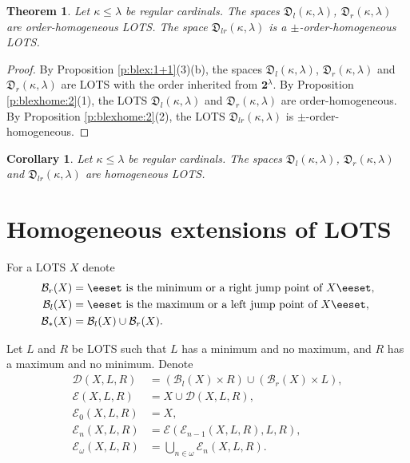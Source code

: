\documentclass[preprint]{elsarticle}
\def\om{\omega}
\def\la{\lambda}
\def\ka{\kappa}
\def\cB{\mathcal{B}}
\def\cE{\mathcal{E}}
\def\set#1{\bbset#1\eeset}
\def\bbset#1:#2\eeset{\{#1\,:\,#2\}}
\def\cB{{\mathcal B}}
\def\cB{{\mathcal B}}
\def\cD{{\mathcal D}}
\newtheorem{theorem}{Theorem}[section]
\newtheorem{cor}{Corollary}[section]
\theoremstyle{definition}
\theoremstyle{remark}
\def\lex#1#2{\mathfrak{L}(#2^{#1})}
\def\lex#1#2{#2^{#1}}
\def\homg#1,#2#3{\mathfrak{D}_{#1}(#2,#3)}
\def\B{2}
\def\B{\mathsf{2}}
\def\B{\mathbf{2}}
\def\lexab{\lex\la\B}
\def\nr{N_r}
\def\nl{N_l}
\def\er{\cB_r}
\def\el{\cB_l}
\def\ea{\cB_*}
\def\ex{\cE}
\begin{document}
\begin{theorem}\label{t:blexhome:1}
Let $\ka\leq\la$ be regular cardinals. The spaces $\homg l,\ka\la$, $\homg r,\ka\la$ are order-homogeneous LOTS. The space $\homg lr,\ka\la$ is a $\pm$-order-homogeneous LOTS.
\end{theorem}
\begin{proof}
By Proposition \ref{p:blex:1+1}(3)(b), the spaces $\homg l,\ka\la$, $\homg r,\ka\la$ and $\homg r,\ka\la$ are LOTS with the order inherited from $\lexab$. By Proposition \ref{p:blexhome:2}(1), the LOTS $\homg l,\ka\la$ and $\homg r,\ka\la$ are order-homogeneous. By Proposition \ref{p:blexhome:2}(2), the LOTS $\homg lr,\ka\la$ is $\pm$-order-homogeneous.
\end{proof}

\begin{cor}\label{c:blexhome:1}
Let $\ka\leq\la$ be regular cardinals. The spaces $\homg l,\ka\la$, $\homg r,\ka\la$ and $\homg lr,\ka\la$ are homogeneous LOTS.
\end{cor}







\section{Homogeneous extensions of LOTS} \label{sec:exos}
For a LOTS $X$ denote 
\begin{align*}
\er(X) &= \set{x\in X: x\text{ is the minimum or a right jump point of }X},
\\
\el(X) &= \set{x\in X: x\text{ is the maximum or a left jump point of }X},
\\
\ea(X) &=  \el(X)\cup\er(X).
\end{align*}

Let $L$ and $R$ be LOTS such that $L$ has a minimum and no maximum, and $R$ has a maximum and no minimum.
Denote
\begin{align*}
\cD(X,L,R) &= (\el(X) \times R) \cup (\er(X) \times L),
\\
\ex(X,L,R) &= X \cup  \cD(X,L,R),
\\
\ex_0(X,L,R) &= X,
\\
\ex_n(X,L,R) &= \ex(\ex_{n-1}(X,L,R),L,R),
\\
\ex_\om(X,L,R) &= \bigcup_{n\in\om} \ex_n(X,L,R).
\end{align*}
\end{document}
